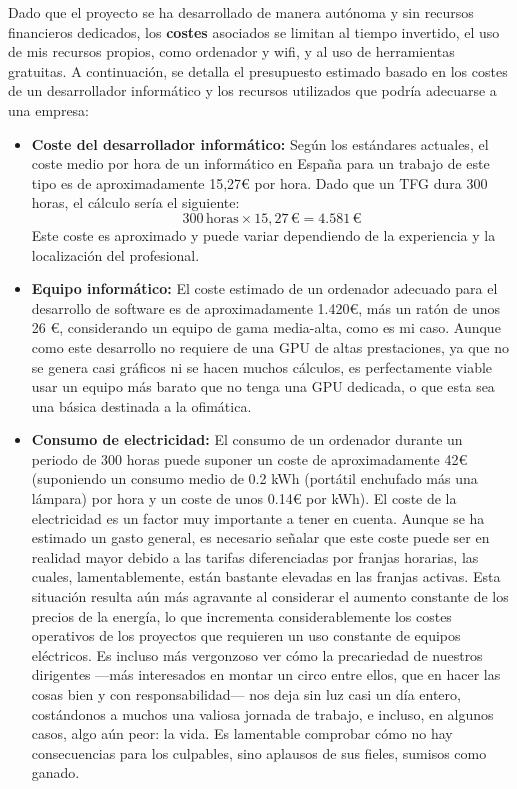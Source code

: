 Dado que el proyecto se ha desarrollado de manera autónoma y sin recursos financieros dedicados, los \textbf{costes} asociados se limitan al tiempo invertido, el uso de mis recursos propios, como ordenador y wifi, y al uso de herramientas gratuitas. A continuación, se detalla el presupuesto estimado basado en los costes de un desarrollador informático y los recursos utilizados que podría adecuarse a una empresa:

\begin{itemize}
    \item \textbf{Coste del desarrollador informático:} Según los estándares actuales, el coste medio por hora de un informático en España para un trabajo de este tipo es de aproximadamente 15,27€ por hora\cite{sueldo}. Dado que un TFG dura 300 horas, el cálculo sería el siguiente:
    \[
    300 \, \text{horas} \times 15,27 \, \text{€} = 4.581 \, \text{€}
    \]
    Este coste es aproximado y puede variar dependiendo de la experiencia y la localización del profesional.

    \item \textbf{Equipo informático:} El coste estimado de un ordenador adecuado para el desarrollo de software es de aproximadamente 1.420€, más un ratón de unos 26 €, considerando un equipo de gama media-alta, como es mi caso. Aunque como este desarrollo no requiere de una GPU de altas prestaciones, ya que no se genera casi gráficos ni se hacen muchos cálculos, es perfectamente viable usar un equipo más barato que no tenga una GPU dedicada, o que esta sea una básica destinada a la ofimática.

    \item \textbf{Consumo de electricidad:} El consumo de un ordenador durante un periodo de 300 horas puede suponer un coste de aproximadamente 42€ (suponiendo un consumo medio de 0.2 kWh (portátil enchufado más una lámpara) por hora\cite{luz} y un coste de unos 0.14€ por kWh). El coste de la electricidad es un factor muy importante a tener en cuenta. Aunque se ha estimado un gasto general, es necesario señalar que este coste puede ser en realidad mayor debido a las tarifas diferenciadas por franjas horarias, las cuales, lamentablemente, están bastante elevadas en las franjas activas. Esta situación resulta aún más agravante al considerar el aumento constante de los precios de la energía, lo que incrementa considerablemente los costes operativos de los proyectos que requieren un uso constante de equipos eléctricos. Es incluso más vergonzoso ver cómo la precariedad de nuestros dirigentes —más interesados en montar un circo entre ellos, que en hacer las cosas bien y con responsabilidad— nos deja sin luz casi un día entero, costándonos a muchos una valiosa jornada de trabajo, e incluso, en algunos casos, algo aún peor: la vida. Es lamentable comprobar cómo no hay consecuencias para los culpables, sino aplausos de sus fieles, sumisos como ganado.



\end{itemize}
